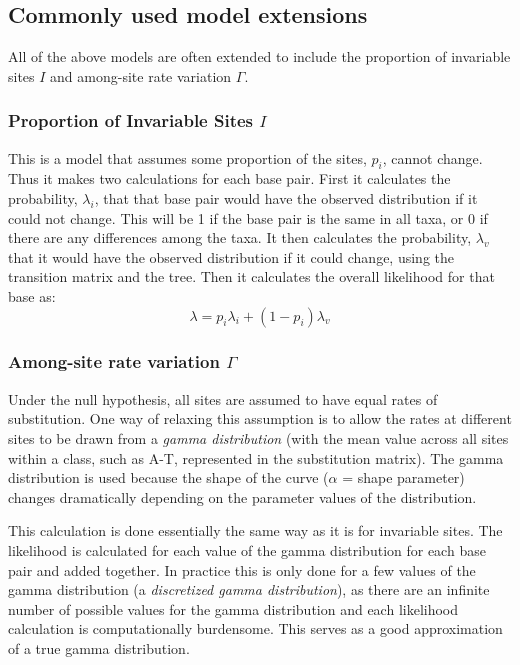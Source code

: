 \documentclass[11pt]{article}
\begin{document}
\subsection{Commonly used model extensions}

All of the above models are often extended to include the proportion of invariable sites $I$
and among-site rate variation $\Gamma$.

\subsubsection{Proportion of Invariable Sites $I$}

This is a model that assumes some proportion of the sites, $p_i$, cannot change.  
Thus it makes two calculations for each base pair.  
First it calculates the probability, $\lambda_i$, that that base pair would have the observed distribution if it could not change.  
This will be 1 if the base pair is the same in all taxa, or 0 if there are any differences among the taxa.  
It then calculates the probability, $\lambda_v$ that it would have the observed distribution if it could change, 
using the transition matrix and the tree.  
Then it calculates the overall likelihood for that base as:
\begin{equation*}
\lambda = p_i \lambda_i + (1 - p_i) \lambda_v
\end{equation*}

\subsubsection{Among-site rate variation $\Gamma$}

Under the null hypothesis, all sites are assumed to have equal rates of substitution.  One way of relaxing this assumption is to allow the rates at different sites to be drawn from a \textit{gamma distribution} (with the mean value across all sites within a class, such as A-T, represented in the substitution matrix).  The gamma distribution is used because the shape of the curve ($\alpha$ = shape parameter) changes dramatically depending on the parameter values of the distribution.  

This calculation is done essentially the same way as it is for invariable sites.  
The likelihood is calculated for each value of the gamma distribution for each base pair and added together.  
In practice this is only done for a few values of the gamma distribution
(a \textit{discretized gamma distribution}), 
as there are an infinite number of possible values for the gamma distribution 
and each likelihood calculation is computationally burdensome.  This serves as a good approximation of a true gamma distribution.
\end{document}
